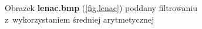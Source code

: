 \documentclass{classrep}
\begin{document}
\begin{figure}
{{  \label{fig.lenac_average_5x5}
 }
}
\caption{Obrazek \textbf{lenac.bmp} (\ref{fig.lenac}) poddany filtrowaniu z~wykorzystaniem średniej arytmetycznej}
\label{fig.lenac_average}
\end{figure}
\end{document}
